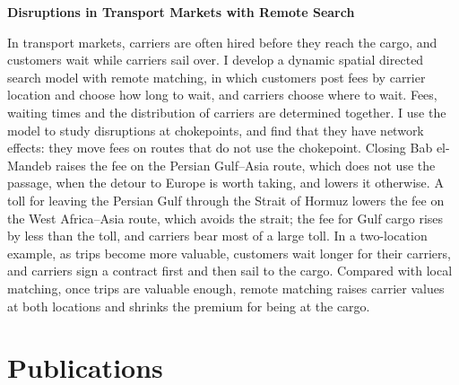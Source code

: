 \documentclass[11pt]{article}
\newcommand{\paper}[1]{\needspace{3\baselineskip}\textbf{#1}\par\vspace{0.15em}}
\begin{document}
\paper{Disruptions in Transport Markets with Remote Search}
In transport markets, carriers are often hired before they reach the cargo, and customers wait while
carriers sail over. I develop a dynamic spatial directed search model with remote matching, in which
customers post fees by carrier location and choose how long to wait, and carriers choose where to
wait. Fees, waiting times and the distribution of carriers are determined together. I use the model
to study disruptions at chokepoints, and find that they have network effects: they move fees on
routes that do not use the chokepoint. Closing Bab el-Mandeb raises the fee on the Persian Gulf--Asia
route, which does not use the passage, when the detour to Europe is worth taking, and lowers it
otherwise. A toll for leaving the Persian Gulf through the Strait of Hormuz lowers the fee on the West
Africa--Asia route, which avoids the strait; the fee for Gulf cargo rises by less than the toll, and
carriers bear most of a large toll. In a two-location example, as trips become more valuable,
customers wait longer for their carriers, and carriers sign a contract first and then sail to the
cargo. Compared with local matching, once trips are valuable enough, remote matching raises carrier
values at both locations and shrinks the premium for being at the cargo.

\section{Publications}
\end{document}
